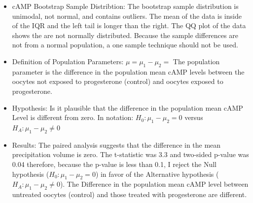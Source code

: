 \documentclass{article}\usepackage[]{graphicx}\usepackage[]{color}
\begin{document}
\begin{itemize}
\item cAMP Bootstrap Sample Distribtion:  The bootstrap sample distribution is unimodal, not normal, and contains outliers.  The mean of the data is inside of the IQR and the left tail is longer than the right. The QQ plot of the data shows the are not normally distributed.  Because the sample differences are not from a normal population, a one sample technique should not be used.

  \item Definition of Population Parameters: $\mu = \mu_1 - \mu_2 = $  The population parameter is  the difference in the population mean cAMP levels between the oocytes not exposed to progesterone (control) and oocytes exposed to progesterone.
  \item Hypothesis:  Is it plausible that the difference in the population mean cAMP Level is different from zero.  In notation:  $H_0: \mu_1 - \mu_2 = 0$ versus $H_A: \mu_1 - \mu_2 \ne 0$
  \item Results:  The paired analysis suggests that the difference in the mean precipitation volume is  zero.  The t-statistic was 3.3 and two-sided p-value was 0.04 therefore, because the p-value is less than 0.1, I reject the Null hypothesis ($H_0: \mu_1 - \mu_2 = 0$) in favor of the Alternative hypothesis ($H_A: \mu_1 - \mu_2 \ne 0$).  The Difference in the population mean cAMP level between untreated oocytes (control) and those treated with progesterone are different.
  \end{itemize}
\end{document}
